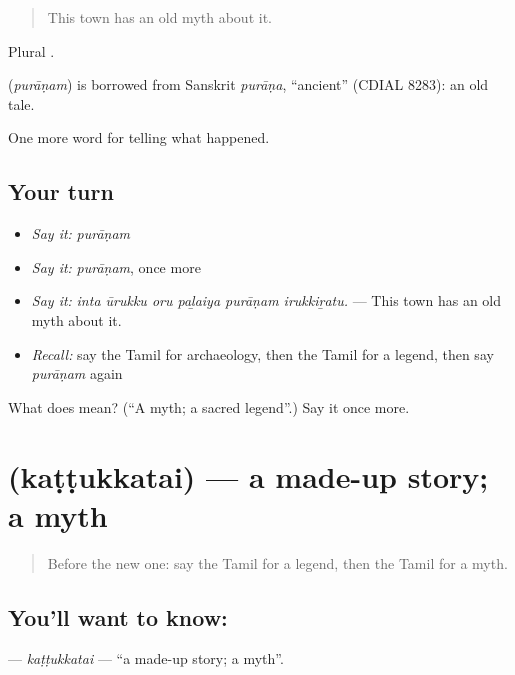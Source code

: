 \begin{quote}
This town has an old myth about it.
\end{quote}

Plural .

\begin{cousinweb}
\textbf{} (\emph{purāṇam}) is borrowed from Sanskrit \emph{purāṇa}, \textquotedblleft{}ancient\textquotedblright{} (CDIAL 8283): an old tale.
\end{cousinweb}

\begin{grammarlens}[title={What you've built}]
One more word for telling what happened.
\end{grammarlens}

\subsection*{Your turn}
\begin{itemize}
\raggedright
  \item \emph{Say it:} \emph{purāṇam}
  \item \emph{Say it:} \emph{purāṇam}, once more
  \item \emph{Say it:} \emph{inta ūrukku oru paḻaiya purāṇam irukkiṟatu.} — This town has an old myth about it.
  \item \emph{Recall:} say the Tamil for archaeology, then the Tamil for a legend, then say \emph{purāṇam} again
\end{itemize}

\begin{tcolorbox}[breakable,colback=teal!4,colframe=teal!35!black,title={Before you move on}]
What does  mean? (\textquotedblleft{}A myth; a sacred legend\textquotedblright{}.) Say it once more.
\end{tcolorbox}
\section[\texorpdfstring{\ta{கட்டுக்கதை} (kaṭṭukkatai)}{கட்டுக்கதை (kaṭṭukkatai)}]{ (kaṭṭukkatai) — a made-up story; a myth}

\label{lesson:TA-C343-kattukkatai}



\begin{quote}
Before the new one: say the Tamil for a legend, then the Tamil for a myth.
\end{quote}

\subsection*{You'll want to know: }
\textbf{} — \emph{kaṭṭukkatai} — \textquotedblleft{}a made-up story; a myth\textquotedblright{}.

